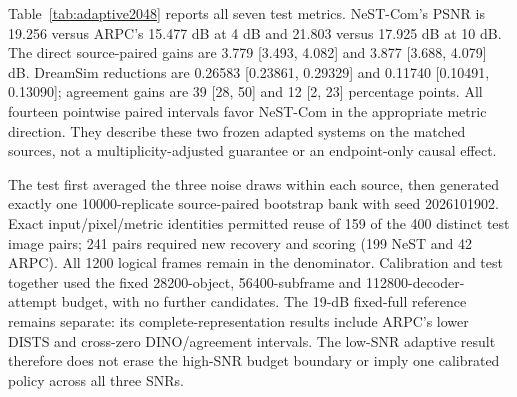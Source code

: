 
Table~\ref{tab:adaptive2048} reports all seven test metrics. NeST-Com's PSNR is 19.256 versus ARPC's 15.477 dB at 4 dB and 21.803 versus 17.925 dB at 10 dB. The direct source-paired gains are 3.779 [3.493, 4.082] and 3.877 [3.688, 4.079] dB. DreamSim reductions are 0.26583 [0.23861, 0.29329] and 0.11740 [0.10491, 0.13090]; agreement gains are 39 [28, 50] and 12 [2, 23] percentage points. All fourteen pointwise paired intervals favor NeST-Com in the appropriate metric direction. They describe these two frozen adapted systems on the matched sources, not a multiplicity-adjusted guarantee or an endpoint-only causal effect.

The test first averaged the three noise draws within each source, then generated exactly one 10000-replicate source-paired bootstrap bank with seed 2026101902. Exact input/pixel/metric identities permitted reuse of 159 of the 400 distinct test image pairs; 241 pairs required new recovery and scoring (199 NeST and 42 ARPC). All 1200 logical frames remain in the denominator. Calibration and test together used the fixed 28200-object, 56400-subframe and 112800-decoder-attempt budget, with no further candidates. The 19-dB fixed-full reference remains separate: its complete-representation results include ARPC's lower DISTS and cross-zero DINO/agreement intervals. The low-SNR adaptive result therefore does not erase the high-SNR budget boundary or imply one calibrated policy across all three SNRs.

